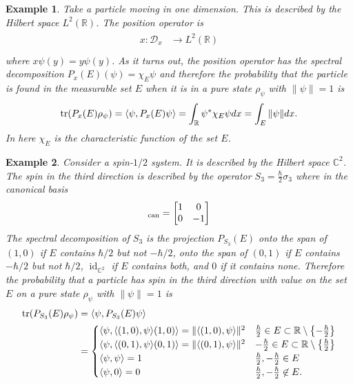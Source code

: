 \documentclass{article}
\newtheorem{example}{Example}
\DeclareMathOperator{\id}{id}
\begin{document}
\begin{example}
Take a particle moving in one dimension. This is described by the Hilbert space $L^2(\mathbb{R})$. The position operator is
\begin{align}
\begin{split}
x:\mathcal{D}_x&\rightarrow L^2(\mathbb{R})\\
\end{split}
\end{align}
where $x\psi(y)=y\psi(y)$. As it turns out, the position operator has the spectral decomposition $P_x(E)(\psi)=\chi_E\psi$ and therefore the probability that the particle is found in the measurable set $E$ when it is in a pure state $\rho_\psi$ with $\|\psi\|=1$ is
\begin{equation}
\tr(P_x(E)\rho_\psi)=\langle\psi,P_x(E)\psi\rangle=\int_\mathbb{R} \psi^*\chi_E\psi dx=\int_E \|\psi\|dx.
\end{equation}
In here $\chi_E$ is the characteristic function of the set $E$.
\end{example}

\begin{example}
Consider a spin-$1/2$ system. It is described by the Hilbert space $\mathbb{C}^2$. The spin in the third direction is described by the operator $S_3=\frac{\hbar}{2}\sigma_3$ where in the canonical basis
\begin{equation}
[\sigma_3]_\text{can}=\mqty[1 & 0\\ 0 & -1]
\end{equation}
The spectral decomposition of $S_3$ is the projection $P_{S_3}(E)$ onto the span of $(1,0)$ if $E$ contains $\hbar/2$ but not $-\hbar/2$, onto the span of $(0,1)$ if $E$ contains $-\hbar/2$ but not $\hbar/2$, $\id_{\mathbb{C}^2}$ if $E$ contains both, and $0$ if it contains none. Therefore the probability that a particle has spin in the third direction with value on the set $E$ on a pure state $\rho_\psi$ with $\|\psi\|=1$ is
\begin{align}
\begin{split}
\tr(P_{S_3}(E)\rho_\psi)&=\langle\psi,P_{S_3}(E)\psi\rangle\\&=\begin{cases}
\langle\psi,\langle(1,0),\psi\rangle(1,0)\rangle=\|\langle(1,0),\psi\rangle\|^2 & \frac{\hbar}{2}\in E\subset\mathbb{R}\setminus\qty{-\frac{\hbar}{2}}\\
\langle\psi,\langle(0,1),\psi\rangle(0,1)\rangle=\|\langle(0,1),\psi\rangle\|^2 & -\frac{\hbar}{2}\in E\subset\mathbb{R}\setminus\qty{\frac{\hbar}{2}}\\
\langle\psi,\psi\rangle = 1 & \frac{\hbar}{2},-\frac{\hbar}{2}\in E\\
\langle\psi,0\rangle = 0 & \frac{\hbar}{2},-\frac{\hbar}{2}\not\in E.
\end{cases}
\end{split}
\end{align}
\end{example}



\end{document}
